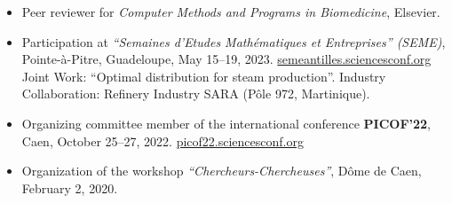 \documentclass[10pt]{article}
\begin{document}
\begin{itemize}
  \item Peer reviewer for \textit{Computer Methods and Programs in Biomedicine}, Elsevier.

  \item Participation at \textit{``Semaines d'Etudes Mathématiques et Entreprises'' (SEME)},  
  Pointe-à-Pitre, Guadeloupe, May 15--19, 2023.  
  \href{https://semeantilles.sciencesconf.org/}{semeantilles.sciencesconf.org}  
  Joint Work: ``Optimal distribution for steam production''.
  Industry Collaboration: Refinery Industry SARA (Pôle 972, Martinique).

  \item Organizing committee member of the international conference \textbf{PICOF'22},  
  Caen, October 25--27, 2022.
  \href{https://picof22.sciencesconf.org/}{picof22.sciencesconf.org}

  \item Organization of the workshop \textit{``Chercheurs-Chercheuses''},  
  Dôme de Caen, February 2, 2020.
\end{itemize}
\end{document}
